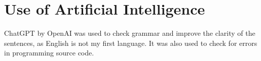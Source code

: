 \chapter{Use of Artificial Intelligence}
\label{sec:ai}

ChatGPT by OpenAI was used to check grammar and improve the clarity of the sentences, as English is not my first language. It was also used to check for errors in programming source code. 
